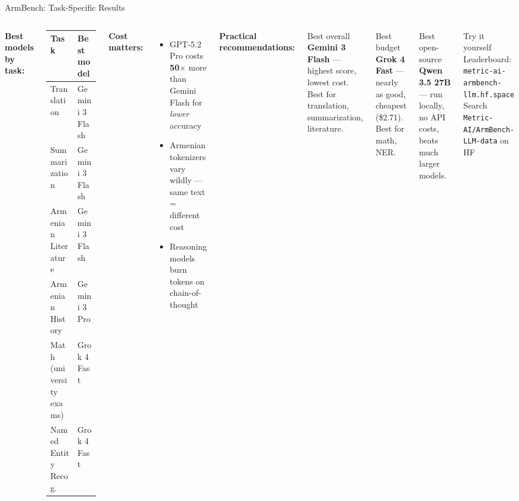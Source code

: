 \documentclass[aspectratio=169]{beamer}
\begin{document}
\begin{frame}{ArmBench: Task-Specific Results}
\footnotesize
\begin{columns}[T]
\textbf{\color{popblue}Best models by task:}

\smallskip
\begin{tabular}{@{}l l@{}}
\toprule
\textbf{Task} & \textbf{Best model} \\
\midrule
Translation & Gemini 3 Flash \\
Summarization & Gemini 3 Flash \\
Armenian Literature & Gemini 3 Flash \\
Armenian History & Gemini 3 Pro \\
Math (university exams) & Grok 4 Fast \\
Named Entity Recog.\ & Grok 4 Fast \\
\bottomrule
\end{tabular}

\smallskip
\small\textbf{\color{warnred}Cost matters:}
\footnotesize
\begin{itemize}\setlength\itemsep{0em}
  \item GPT-5.2 Pro costs \textbf{50$\times$} more than Gemini Flash for \emph{lower} accuracy
  \item Armenian tokenizers vary wildly --- same text = different cost
  \item Reasoning models burn tokens on chain-of-thought
\end{itemize}

\small\textbf{\color{paramgreen}Practical recommendations:}
\footnotesize

\begin{block}{Best overall}
\textbf{Gemini 3 Flash} --- highest score, lowest cost. Best for translation, summarization, literature.
\end{block}

\begin{block}{Best budget}
\textbf{Grok 4 Fast} --- nearly as good, cheapest (\$2.71). Best for math, NER.
\end{block}

\begin{block}{Best open-source}
\textbf{Qwen 3.5 27B} --- run locally, no API costs, beats much larger models.
\end{block}

\begin{alertblock}{Try it yourself}
\scriptsize
Leaderboard: \texttt{metric-ai-armbench-llm.hf.space}\\
Search \texttt{Metric-AI/ArmBench-LLM-data} on HF
\end{alertblock}
\end{columns}
\end{frame}
\end{document}
